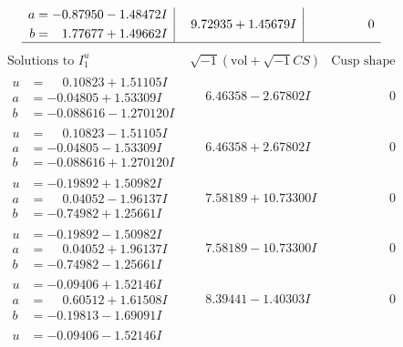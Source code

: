 \documentclass[1p]{elsarticle_modified}
\theoremstyle{definition}
\newcommand{\I}{\sqrt{-1}}
\begin{document}
$$\begin{array}{c|c|c}
\begin{aligned}
a &= -0.87950 - 1.48472 I \\
b &= \phantom{-}1.77677 + 1.49662 I\end{aligned}
 & \phantom{-}9.72935 + 1.45679 I & \phantom{-0.000000 } 0\\
 \hline 
 \end{array}$$\newpage$$\begin{array}{c|c|c}  
\text{Solutions to }I^u_{1}& \I (\text{vol} + \sqrt{-1}CS) & \text{Cusp shape}\\
 \hline 
\begin{aligned}
u &= \phantom{-}0.10823 + 1.51105 I \\
a &= -0.04805 + 1.53309 I \\
b &= -0.088616 - 1.270120 I\end{aligned}
 & \phantom{-}6.46358 - 2.67802 I & \phantom{-0.000000 } 0 \\ \hline\begin{aligned}
u &= \phantom{-}0.10823 - 1.51105 I \\
a &= -0.04805 - 1.53309 I \\
b &= -0.088616 + 1.270120 I\end{aligned}
 & \phantom{-}6.46358 + 2.67802 I & \phantom{-0.000000 } 0 \\ \hline\begin{aligned}
u &= -0.19892 + 1.50982 I \\
a &= \phantom{-}0.04052 - 1.96137 I \\
b &= -0.74982 + 1.25661 I\end{aligned}
 & \phantom{-}7.58189 + 10.73300 I & \phantom{-0.000000 } 0 \\ \hline\begin{aligned}
u &= -0.19892 - 1.50982 I \\
a &= \phantom{-}0.04052 + 1.96137 I \\
b &= -0.74982 - 1.25661 I\end{aligned}
 & \phantom{-}7.58189 - 10.73300 I & \phantom{-0.000000 } 0 \\ \hline\begin{aligned}
u &= -0.09406 + 1.52146 I \\
a &= \phantom{-}0.60512 + 1.61508 I \\
b &= -0.19813 - 1.69091 I\end{aligned}
 & \phantom{-}8.39441 - 1.40303 I & \phantom{-0.000000 } 0 \\ \hline\begin{aligned}
u &= -0.09406 - 1.52146 I \\

\end{aligned}
\end{array}$$
\end{document}
